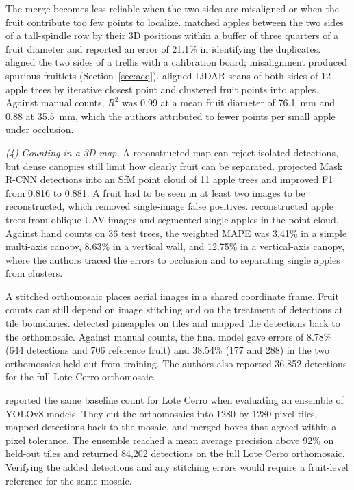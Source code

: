 The merge becomes less reliable when the two sides are misaligned or when the fruit contribute too few points to localize. \citet{gongal2016apple} matched apples between the two sides of a tall-spindle row by their 3D positions within a buffer of three quarters of a fruit diameter and reported an error of 21.1\% in identifying the duplicates. \citet{qureshi2023seeing} aligned the two sides of a trellis with a calibration board; misalignment produced spurious fruitlets (Section~\ref{sec:acq}). \citet{tsoulias2023situ} aligned LiDAR scans of both sides of 12 apple trees by iterative closest point and clustered fruit points into apples. Against manual counts, $R^2$ was 0.99 at a mean fruit diameter of 76.1~mm and 0.88 at 35.5~mm, which the authors attributed to fewer points per small apple under occlusion.

\textit{(4) Counting in a 3D map.} A reconstructed map can reject isolated detections, but dense canopies still limit how clearly fruit can be separated. \citet{genemola2020fruitb} projected Mask R-CNN detections into an SfM point cloud of 11 apple trees and improved F1 from 0.816 to 0.881. A fruit had to be seen in at least two images to be reconstructed, which removed single-image false positives. \citet{dong2023three} reconstructed apple trees from oblique UAV images and segmented single apples in the point cloud. Against hand counts on 36 test trees, the weighted MAPE was 3.41\% in a simple multi-axis canopy, 8.63\% in a vertical wall, and 12.75\% in a vertical-axis canopy, where the authors traced the errors to occlusion and to separating single apples from clusters.

A stitched orthomosaic places aerial images in a shared coordinate frame. Fruit counts can still depend on image stitching and on the treatment of detections at tile boundaries. \citet{sandi2026implementation} detected pineapples on tiles and mapped the detections back to the orthomosaic. Against manual counts, the final model gave errors of 8.78\% (644 detections and 706 reference fruit) and 38.54\% (177 and 288) in the two orthomosaics held out from training. The authors also reported 36,852 detections for the full Lote Cerro orthomosaic.

\citet{mejiashernandez2026automated} reported the same baseline count for Lote Cerro when evaluating an ensemble of YOLOv8 models. They cut the orthomosaics into 1280-by-1280-pixel tiles, mapped detections back to the mosaic, and merged boxes that agreed within a pixel tolerance. The ensemble reached a mean average precision above 92\% on held-out tiles and returned 84,202 detections on the full Lote Cerro orthomosaic. Verifying the added detections and any stitching errors would require a fruit-level reference for the same mosaic.

